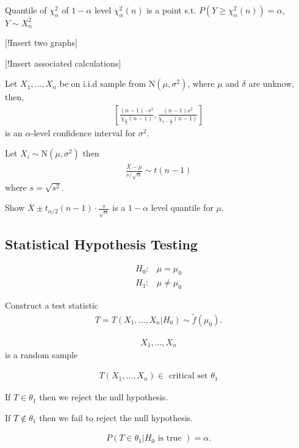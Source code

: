 \documentclass[10pt]{article}
\begin{document}
Quantile of \(\chi  _{n} ^2\) of \(1 - \alpha\) level \(\chi ^2  _{\alpha } (n)\) is a point s.t.
\(P(Y \geq \chi  _{\alpha } ^2 (n)) = \alpha\), \(Y \sim X _{n} ^2\)

[!Insert two graphs]

[!Insert associated calculations]


\begin{theorem}[] \label{thm:}
Let \(X_1, \dots , X_n\) be on i.i.d sample from \(\text{N}(\mu , \sigma^2)\), where
\(\mu\) and \(\delta\) are unknow, then,
\begin{align*}
\left[ \frac{(n - 1) \cdot s^2 }{\chi  _{\frac{\alpha}{2}}(n - 1) }, \frac{(n - 1) s ^2 }{\chi  _{1 - \frac{\alpha}{2}} (n - 1)} \right] 
\end{align*}
is an \(\alpha\)-level confidence interval for \(\sigma ^2\).
\end{theorem}

Let \(X_i \sim \text{N}(\mu , \sigma^2)\) then
\begin{align*}
\frac{\overline{X} - \mu }{s / \sqrt{n}} \sim t(n - 1)
\end{align*}
where \(s = \sqrt{s^2 }\).

\begin{exercise}[]  \label{exe:}
Show \(\overline{X} \pm t _{\alpha  / 2} (n - 1) \cdot \frac{s}{\sqrt{n}}\) is a \(1 - \alpha\) level quantile for \(\mu\).
\end{exercise}


\subsection{Statistical Hypothesis Testing}
\label{sec:org257db6e}


\begin{align*}
H_0 :  &  \mu = \mu  _{0}  \\
H_1 :  &  \mu \neq \mu  _{0} 
\end{align*}

Construct a test statistic
\begin{align*}
T = T(X_1, \dots , X_n | H_0) \sim \tilde{f}(\mu  _{0} ).
\end{align*}

\begin{align*}
X_1, \dots , X_n
\end{align*}
is a random sample

\begin{align*}
T(X_1 , \dots , X_n) \in  \text{ critical set } \theta  _{1} 
\end{align*}

If \(T \in  \theta  _{1}\) then we reject the null hypothesis.

If \(T \not\in \theta  _{1}\) then we fail to reject the null hypothesis.

\begin{align*}
P(T \in  \theta  _{1}  | H_0 \text{ is true }) = \alpha .
\end{align*}
\end{document}
